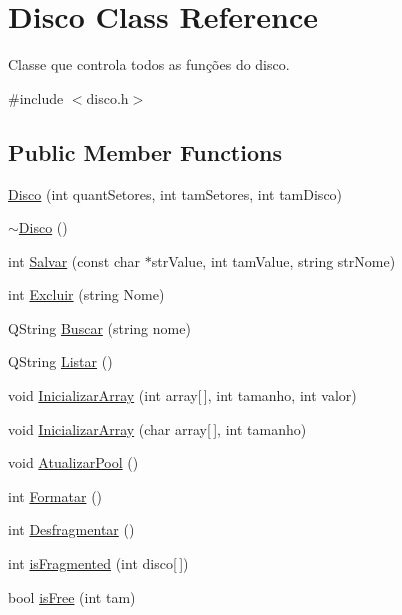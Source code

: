 \hypertarget{classDisco}{}\section{Disco Class Reference}
\label{classDisco}


Classe que controla todos as funções do disco.  




{\ttfamily \#include $<$disco.\+h$>$}

\subsection*{Public Member Functions}
\begin{DoxyCompactItemize}
\item 
\hyperlink{classDisco_a8f87658574d2528cb32b4c975716fa38}{Disco} (int quant\+Setores, int tam\+Setores, int tam\+Disco)
\item 
\hyperlink{classDisco_a9e8131123ed8969c7608ce877c765029}{$\sim$\+Disco} ()
\item 
int \hyperlink{classDisco_af09da728510fdb43fa68430e743ab7c4}{Salvar} (const char $\ast$str\+Value, int tam\+Value, string str\+Nome)
\item 
int \hyperlink{classDisco_ae9ed7d8acb5337a471c37f90de72aeee}{Excluir} (string Nome)
\item 
Q\+String \hyperlink{classDisco_a087a7b5e2524e8e49a984633ee9b6df2}{Buscar} (string nome)
\item 
Q\+String \hyperlink{classDisco_a3b6171128d70b61f64f6c8eb1e9912f9}{Listar} ()
\item 
void \hyperlink{classDisco_a9d47269b52e2b2d5d73f28321687c591}{Inicializar\+Array} (int array\mbox{[}$\,$\mbox{]}, int tamanho, int valor)
\item 
void \hyperlink{classDisco_a074de498eae7bf3073bd6abf6f2169d0}{Inicializar\+Array} (char array\mbox{[}$\,$\mbox{]}, int tamanho)
\item 
void \hyperlink{classDisco_a8ea8c8b8df931b1bf74a967ed694fa45}{Atualizar\+Pool} ()
\item 
int \hyperlink{classDisco_a94f70ad19848fd60993332fa2f56a594}{Formatar} ()
\item 
int \hyperlink{classDisco_ac12c64821a3e4f617ff584f587471e85}{Desfragmentar} ()
\item 
int \hyperlink{classDisco_a3f557c45c79a1e571af9bb2688090aa4}{is\+Fragmented} (int disco\mbox{[}$\,$\mbox{]})
\item 
bool \hyperlink{classDisco_a878eccb7cbd9c0e7c04452cad7bfbfb5}{is\+Free} (int tam)

\end{DoxyCompactItemize}
